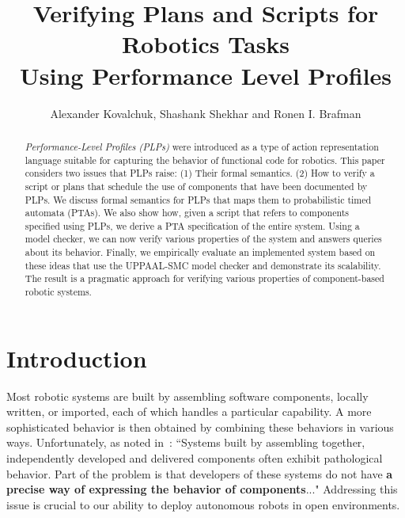 \documentclass[letterpaper]{article}
\title{Verifying Plans and Scripts for Robotics Tasks \\ Using Performance Level Profiles}
\author{
    Alexander Kovalchuk, Shashank Shekhar {\normalfont and} Ronen I. Brafman \\
}
\begin{document}
\maketitle




\begin{abstract}
{\em Performance-Level Profiles (PLPs)\/} were introduced as a
type of action representation language suitable for capturing the behavior of functional code for robotics. This paper considers two issues that PLPs raise: (1) Their formal semantics. (2) How to verify a script or plans that schedule the use of components that have been documented by PLPs. We discuss formal semantics for PLPs that maps them to probabilistic timed automata (PTAs). We also show how, given a script that refers to components specified using PLPs, we derive a PTA specification of the entire system. Using a model checker, we can now verify various properties of the system and answers queries about its behavior. Finally, we empirically evaluate an implemented system based on these ideas that use the UPPAAL-SMC model checker
and demonstrate its scalability. The result is a pragmatic approach for verifying various properties of component-based robotic systems.
\end{abstract}




\section{Introduction}
Most robotic systems are built by assembling software components, locally written, or imported, each of which handles a particular capability. A more sophisticated behavior is then obtained by combining these behaviors in various ways.
Unfortunately, as noted in~\citet{Abdellatif12}: ``Systems built by assembling together, independently developed and delivered components often exhibit pathological behavior. Part of the problem is that developers of these systems do not have {\bf a precise way of expressing the behavior of components}..."
Addressing this issue is crucial to our ability to deploy autonomous robots in open environments.

\end{document}
